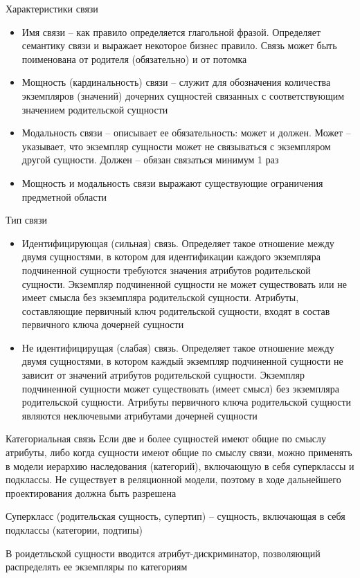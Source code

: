 \documentclass[12pt]{article}
\begin{document}
\begin{nota}{Характеристики связи}
    \begin{itemize}
        \item Имя связи -- как правило определяется глагольной фразой. Определяет семантику связи и выражает некоторое бизнес правило. Связь может быть поименована от родителя (обязательно) и от потомка
        \item Мощность (кардинальность) связи -- служит для обозначения количества экземпляров (значений) дочерних сущностей связанных с соответствующим значением родительской сущности 
        \item Модальность связи -- описывает ее обязательность: может и должен. Может -- указывает, что экземпляр сущности может не связываться с экземпляром другой сущности. Должен -- обязан связаться минимум 1 раз 
        \item Мощность и модальность связи выражают существующие ограничения предметной области 
    \end{itemize}
\end{nota}

\begin{nota}{Тип связи}
    \begin{itemize}
        \item Идентифицирующая (сильная) связь. Определяет такое отношение между двумя сущностями, в котором для идентификации каждого экземпляра подчиненной сущности требуются значения атрибутов родительской сущности. Экземпляр подчиненной сущности не может существовать или не имеет смысла без экземпляра родительской сущности. Атрибуты, составляющие первичный ключ родительской сущности, входят в состав первичного ключа дочерней сущности 
        \item Не идентифицирущая (слабая) связь. Определяет такое отношение между двумя сущностями, в котором каждый экземпляр подчиненной сущности не зависит от значений атрибутов родительской сущности. Экземпляр подчиненной сущности может существовать (имеет смысл) без экземпляра родительской сущности. Атрибуты первичного ключа родительской сущности являются неключевыми атрибутами дочерней сущности
    \end{itemize}
\end{nota}

\begin{nota}{Категориальная связь}
    Если две и более сущностей имеют общие по смыслу атрибуты, либо когда сущности имеют общие по смыслу связи, можно применять в модели иерархию наследования (категорий), включающую в себя суперклассы и подклассы. Не существует в реляционной модели, поэтому в ходе дальнейшего проектирования должна быть разрешена 

    Суперкласс (родительская сущность, супертип) -- сущность, включающая в себя подклассы (категории, подтипы)

    В роидетльской сущности вводится атрибут-дискриминатор, позволяющий распределять ее экземпляры по категориям 
\end{nota}
\end{document}
